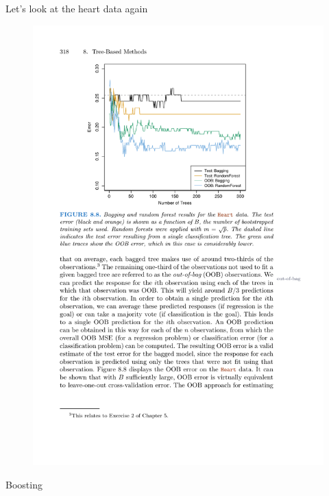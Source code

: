 \documentclass[mathserif, aspectratio=169]{beamer}
\begin{document}
\begin{frame}{Let's look at the heart data again}

\begin{figure}
\includegraphics[height=0.85\textheight]{islr88.pdf}
\caption*{}
\end{figure}
\end{frame}

\begin{frame}{}
\LARGE
\begin{center}
Boosting
\end{center}
\end{frame}
\end{document}
